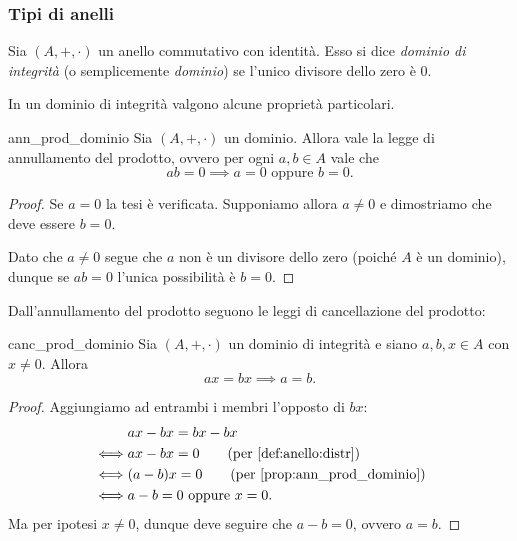 \subsubsection{Tipi di anelli}

\begin{definition}
    \label{def:dominio}
    Sia $(A, +, \cdot)$ un anello commutativo con identità. Esso si dice \emph{dominio di integrità} (o semplicemente \emph{dominio}) se l'unico divisore dello zero è $0$.
\end{definition}

In un dominio di integrità valgono alcune proprietà particolari.

\begin{proposition}
    {ann_prod_dominio}
    Sia $(A, +, \cdot)$ un dominio. Allora vale la legge di annullamento del prodotto, ovvero per ogni $a, b \in A$ vale che \[
        ab = 0 \implies a = 0 \text{ oppure } b = 0.    
    \]
\end{proposition}
\begin{proof}
    Se $a = 0$ la tesi è verificata. Supponiamo allora $a \neq 0$ e dimostriamo che deve essere $b = 0$.

    Dato che $a \neq 0$ segue che $a$ non è un divisore dello zero (poiché $A$ è un dominio), dunque se $ab = 0$ l'unica possibilità è $b = 0$.
\end{proof}

Dall'annullamento del prodotto seguono le leggi di cancellazione del prodotto:
\begin{corollary}
    {canc_prod_dominio}
    Sia $(A, +, \cdot)$ un dominio di integrità e siano $a, b, x \in A$ con $x \neq 0$. Allora \[
        ax = bx \implies a = b.    
    \]
\end{corollary}
\begin{proof}
    Aggiungiamo ad entrambi i membri l'opposto di $bx$: \begin{align*}
        &ax - bx = bx - bx\\
        \iff &ax - bx = 0 \tag{per \ref{def:anello:distr}}\\
        \iff &(a - b)x = 0 \tag{per \ref{prop:ann_prod_dominio}}\\
        \iff &a-b = 0 \text{ oppure } x = 0.
    \end{align*} Ma per ipotesi $x \neq 0$, dunque deve seguire che $a - b = 0$, ovvero $a = b$.
\end{proof}


